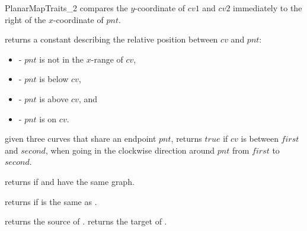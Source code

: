 \begin{ccRefConcept}{PlanarMapTraits_2}
    {compares the $y$-coordinate of $cv1$ and $cv2$ immediately to the right of
     the $x$-coordinate of $pnt$.
    }
    
     {returns a constant describing the
       relative position between $cv$ and $pnt$:
       \begin{itemize}
       \item[] - $pnt$ is not in the $x$-range of
       $cv$, 
       \item[] - $pnt$ is below $cv$,
       \item[] - $pnt$ is above $cv$, and
       \item[] - $pnt$ is on $cv$.
       \end{itemize}}
       
        {given three curves that share an endpoint $pnt$,
          returns $true$ if $cv$ is between $first$ and $second$, when
          going in the clockwise direction around $pnt$ from $first$
          to $second$. }


       {returns  if  and  have the same graph.}

       {returns  if  is the same as .}
	  

             {returns the source of .}
             {returns the target of .}


      

\end{ccRefConcept}
